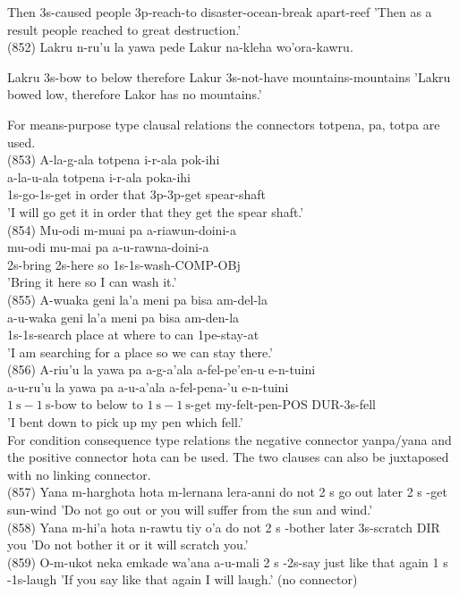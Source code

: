 \documentclass[10pt]{article}
\begin{document}
Then 3s-caused people 3p-reach-to disaster-ocean-break apart-reef 'Then as a result people reached to great destruction.'\\
(852) Lakru n-ru'u la yawa pede Lakur na-kleha wo'ora-kawru.

Lakru 3s-bow to below therefore Lakur 3s-not-have mountains-mountains 'Lakru bowed low, therefore Lakor has no mountains.'

For means-purpose type clausal relations the connectors totpena, pa, totpa are used.\\
(853) A-la-g-ala totpena i-r-ala pok-ihi\\
a-la-u-ala totpena i-r-ala poka-ihi\\
1s-go-1s-get in order that 3p-3p-get spear-shaft\\
'I will go get it in order that they get the spear shaft.'\\
(854) Mu-odi m-muai pa a-riawun-doini-a\\
mu-odi mu-mai pa a-u-rawna-doini-a\\
2s-bring 2s-here so 1s-1s-wash-COMP-OBj\\
'Bring it here so I can wash it.'\\
(855) A-wuaka geni la’a meni pa bisa am-del-la\\
a-u-waka geni la'a meni pa bisa am-den-la\\
1s-1s-search place at where to can 1pe-stay-at\\
'I am searching for a place so we can stay there.'\\
(856) A-riu'u la yawa pa a-g-a'ala a-fel-pe'en-u e-n-tuini\\
a-u-ru'u la yawa pa a-u-a'ala a-fel-pena-'u e-n-tuini\\
\(1 \mathrm{~s}-1 \mathrm{~s}\)-bow to below to \(1 \mathrm{~s}-1 \mathrm{~s}\)-get my-felt-pen-POS DUR-3s-fell\\
'I bent down to pick up my pen which fell.'\\
For condition consequence type relations the negative connector yanpa/yana and the positive connector hota can be used. The two clauses can also be juxtaposed with no linking connector.\\
(857) Yana m-harghota hota m-lernana lera-anni do not 2 s go out later 2 s -get sun-wind 'Do not go out or you will suffer from the sun and wind.'\\
(858) Yana m-hi'a hota n-rawtu tiy o'a do not 2 s -bother later 3s-scratch DIR you 'Do not bother it or it will scratch you.'\\
(859) O-m-ukot neka emkade wa'ana a-u-mali 2 s -2s-say just like that again 1 s -1s-laugh 'If you say like that again I will laugh.' (no connector)
\end{document}
